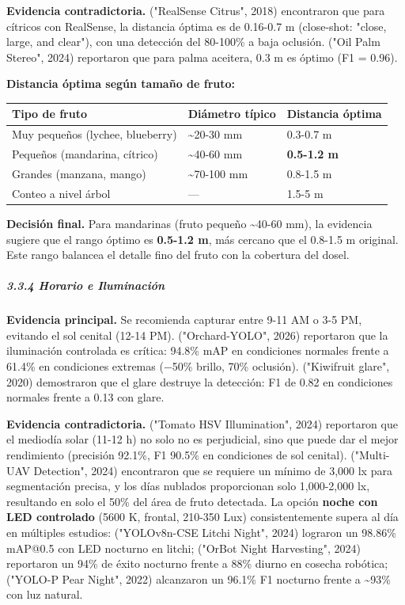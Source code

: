 \textbf{Evidencia contradictoria.} ("RealSense Citrus", 2018) encontraron que para cítricos con RealSense, la distancia óptima es de 0.16-0.7 m (close-shot: "close, large, and clear"), con una detección del 80-100\% a baja oclusión. ("Oil Palm Stereo", 2024) reportaron que para palma aceitera, 0.3 m es óptimo (F1 = 0.96).


\textbf{Distancia óptima según tamaño de fruto:}



\begin{tabular}{lll}
\hline
Tipo de fruto & Diámetro típico & Distancia óptima \\
\hline
Muy pequeños (lychee, blueberry) & \textasciitilde{}20-30 mm & 0.3-0.7 m \\
Pequeños (mandarina, cítrico) & \textasciitilde{}40-60 mm & \textbf{0.5-1.2 m} \\
Grandes (manzana, mango) & \textasciitilde{}70-100 mm & 0.8-1.5 m \\
Conteo a nivel árbol & — & 1.5-5 m \\
\hline
\end{tabular}


\textbf{Decisión final.} Para mandarinas (fruto pequeño \textasciitilde{}40-60 mm), la evidencia sugiere que el rango óptimo es \textbf{0.5-1.2 m}, más cercano que el 0.8-1.5 m original. Este rango balancea el detalle fino del fruto con la cobertura del dosel.


\subparagraph{3.3.4 Horario e Iluminación}


\textbf{Evidencia principal.} Se recomienda capturar entre 9-11 AM o 3-5 PM, evitando el sol cenital (12-14 PM). ("Orchard-YOLO", 2026) reportaron que la iluminación controlada es crítica: 94.8\% mAP en condiciones normales frente a 61.4\% en condiciones extremas (−50\% brillo, 70\% oclusión). ("Kiwifruit glare", 2020) demostraron que el glare destruye la detección: F1 de 0.82 en condiciones normales frente a 0.13 con glare.


\textbf{Evidencia contradictoria.} ("Tomato HSV Illumination", 2024) reportaron que el mediodía solar (11-12 h) no solo no es perjudicial, sino que puede dar el mejor rendimiento (precisión 92.1\%, F1 90.5\% en condiciones de sol cenital). ("Multi-UAV Detection", 2024) encontraron que se requiere un mínimo de 3,000 lx para segmentación precisa, y los días nublados proporcionan solo 1,000-2,000 lx, resultando en solo el 50\% del área de fruto detectada. La opción \textbf{noche con LED controlado} (5600 K, frontal, 210-350 Lux) consistentemente supera al día en múltiples estudios: ("YOLOv8n-CSE Litchi Night", 2024) lograron un 98.86\% mAP@0.5 con LED nocturno en litchi; ("OrBot Night Harvesting", 2024) reportaron un 94\% de éxito nocturno frente a 88\% diurno en cosecha robótica; ("YOLO-P Pear Night", 2022) alcanzaron un 96.1\% F1 nocturno frente a \textasciitilde{}93\% con luz natural.


